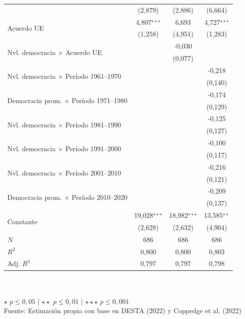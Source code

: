 \documentclass[a4paper]{tufte-handout}
\begin{document}
\begin{table}[h!]
\begin{tabular}{l c c c}
    & {\scriptsize (2,879)} & {\scriptsize (2,886)} & {\scriptsize (6,664)}\\
    \multirow{2}{*}{Acuerdo UE} & 4,807$^{\star\star\star}$ & 6,693 & 4,727$^{\star\star\star}$ \\
    & {\scriptsize (1,258)} & {\scriptsize (4,951)} & {\scriptsize (1,283)}\\
    \multirow{2}{*}{Nvl. democracia $\times$ Acuerdo UE} & & -0,030 & \\
    & & {\scriptsize (0,077)} & \\
    \multirow{2}{*}{Nvl. democracia $\times$ Período 1961--1970} & & & -0,218 \\
    & & & {\scriptsize (0,140)}\\
    \multirow{2}{*}{Democracia prom. $\times$ Período 1971--1980} & & & -0,174 \\
    & & & {\scriptsize (0,129)}\\
    \multirow{2}{*}{Nvl. democracia $\times$ Período 1981--1990} & & & -0,125 \\
    & & & {\scriptsize (0,127)}\\
    \multirow{2}{*}{Nvl. democracia $\times$ Período 1991--2000} & & & -0,100 \\
    & & & {\scriptsize (0,117)}\\
    \multirow{2}{*}{Nvl. democracia $\times$ Período 2001--2010} & & & -0,216 \\
    & & & {\scriptsize (0,121)}\\
    \multirow{2}{*}{Democracia prom. $\times$ Período 2010--2020} & & & -0,209 \\
    & & & {\scriptsize (0,137)}\\
    \multirow{2}{*}{Constante} & 19,028$^{\star\star\star}$ & 18,982$^{\star\star\star}$ & 13,585$^{\star\star}$  \\
    & {\scriptsize (2,628)} & {\scriptsize (2,632)} & {\scriptsize (4,904)} \\ \midrule
    $N$ & 686 & 686 & 686 \\ \midrule
    $R^2$ & 0,800 & 0,800 & 0,803 \\
    Adj. $R^2$ & 0,797 & 0,797 & 0,798 \\ \bottomrule
  \end{tabular}
  \\~\\ \smallskip\noindent\scriptsize $\star$ $p \leq 0,05$ | $\star\star$ $p \leq 0,01$ | $\star\star\star$ $p \leq 0,001$  \\ Fuente: Estimación propia con base en DESTA (2022) y Coppedge et al. (2022)
\end{table}
\pagebreak
\end{document}
